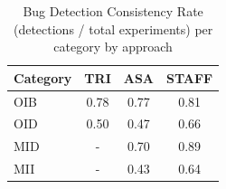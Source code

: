 \begin{table}[ht]
\centering
\renewcommand{\arraystretch}{1.1}
\begin{tabular}{|l||c|c|c|}
\hline
{\sc Category} & {\sc TRI} & {\sc ASA} & {\sc STAFF} \\
\hline\hline
OIB & 0.78 & 0.77 & 0.81 \\
OID & 0.50 & 0.47 & 0.66 \\
MID & - & 0.70 & 0.89 \\
MII & - & 0.43 & 0.64 \\
\hline
\end{tabular}
\caption{Bug Detection Consistency Rate (detections / total experiments) per category by approach}
\label{tab:detection_consistency}
\end{table}
